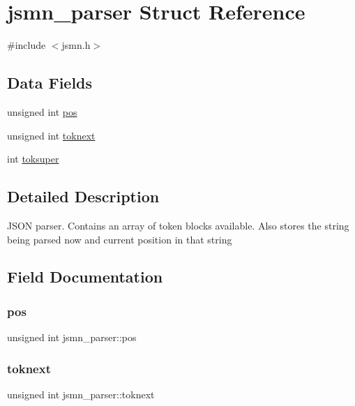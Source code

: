 \hypertarget{structjsmn__parser}{}\section{jsmn\+\_\+parser Struct Reference}
\label{structjsmn__parser}


{\ttfamily \#include $<$jsmn.\+h$>$}

\subsection*{Data Fields}
\begin{DoxyCompactItemize}
\item 
unsigned int \mbox{\hyperlink{structjsmn__parser_a3d0d6e48d3d5b24262f9e0c2241dc456}{pos}}
\item 
unsigned int \mbox{\hyperlink{structjsmn__parser_af640efd7d154218124a964b65f114bff}{toknext}}
\item 
int \mbox{\hyperlink{structjsmn__parser_af11fcec48d9f1298909777a12f1d1e39}{toksuper}}
\end{DoxyCompactItemize}


\subsection{Detailed Description}
J\+S\+ON parser. Contains an array of token blocks available. Also stores the string being parsed now and current position in that string 

\subsection{Field Documentation}
\mbox{\label{structjsmn__parser_a3d0d6e48d3d5b24262f9e0c2241dc456}} 
\subsubsection{\texorpdfstring{pos}{pos}}
{\footnotesize\ttfamily unsigned int jsmn\+\_\+parser\+::pos}

\mbox{\label{structjsmn__parser_af640efd7d154218124a964b65f114bff}} 
\subsubsection{\texorpdfstring{toknext}{toknext}}
{\footnotesize\ttfamily unsigned int jsmn\+\_\+parser\+::toknext}

